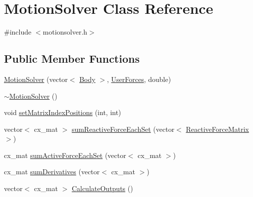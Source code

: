 \hypertarget{class_motion_solver}{\section{Motion\-Solver Class Reference}
\label{class_motion_solver}
}


{\ttfamily \#include $<$motionsolver.\-h$>$}

\subsection*{Public Member Functions}
\begin{DoxyCompactItemize}
\item 
\hyperlink{class_motion_solver_ae231d7c407ef35357e519053091b6003}{Motion\-Solver} (vector$<$ \hyperlink{class_body}{Body} $>$, \hyperlink{class_user_forces}{User\-Forces}, double)
\item 
\hyperlink{class_motion_solver_ae1fb5f389752a21a6d65ce41599b9b91}{$\sim$\-Motion\-Solver} ()
\item 
void \hyperlink{class_motion_solver_ac6c03c2a45d7868b5acb76324fa29279}{set\-Matrix\-Index\-Positions} (int, int)
\item 
vector$<$ cx\-\_\-mat $>$ \hyperlink{class_motion_solver_a89c37a28a333474de2d0d51bada81afa}{sum\-Reactive\-Force\-Each\-Set} (vector$<$ \hyperlink{class_reactive_force_matrix}{Reactive\-Force\-Matrix} $>$)
\item 
cx\-\_\-mat \hyperlink{class_motion_solver_a58ec4344deda599d9b1de11aa3e6abde}{sum\-Active\-Force\-Each\-Set} (vector$<$ cx\-\_\-mat $>$)
\item 
cx\-\_\-mat \hyperlink{class_motion_solver_a26a41ac6907d24228de0a6ddcf9911ce}{sum\-Derivatives} (vector$<$ cx\-\_\-mat $>$)
\item 
vector$<$ cx\-\_\-mat $>$ \hyperlink{class_motion_solver_a2358d623842d0634576d978db98b9198}{Calculate\-Outputs} ()
\end{DoxyCompactItemize}
